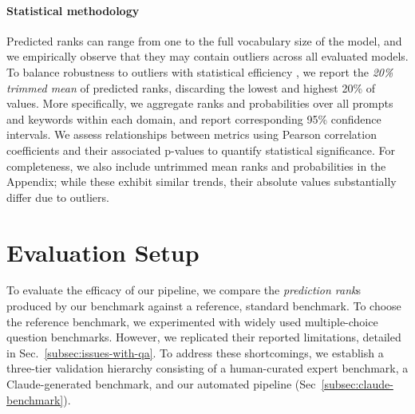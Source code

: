 \documentclass[10pt]{article}
\begin{document}
 
\paragraph{Statistical methodology}
Predicted ranks can range from one to the full vocabulary size of the model, and we empirically observe that they may contain outliers across all evaluated models. To balance robustness to outliers with statistical efficiency \citep{rosenberger1983comparing, wilcox2003modern}, we report the \textit{20\% trimmed mean} of predicted ranks, discarding the lowest and highest 20\% of values. More specifically, we aggregate ranks and probabilities over all prompts and keywords within each domain, and report corresponding 95\% confidence intervals. We assess relationships between metrics using Pearson correlation coefficients and their associated p-values to quantify statistical significance. For completeness, we also include untrimmed mean ranks and probabilities in the Appendix; while these exhibit similar trends, their absolute values substantially differ due to outliers.


\section{Evaluation Setup} \vspace*{-.25cm}
\label{sec:exps}
To evaluate the efficacy of our pipeline, we compare the \textit{prediction rank}s produced by our benchmark against a reference, standard benchmark. To choose the reference benchmark, we experimented with widely used multiple-choice question benchmarks. However, we replicated their reported limitations, detailed in Sec.~\ref{subsec:issues-with-qa}. To address these shortcomings, we establish a three-tier validation hierarchy consisting of a human-curated expert benchmark, a Claude-generated benchmark, and our automated pipeline (Sec~\ref{subsec:claude-benchmark}).
\end{document}
